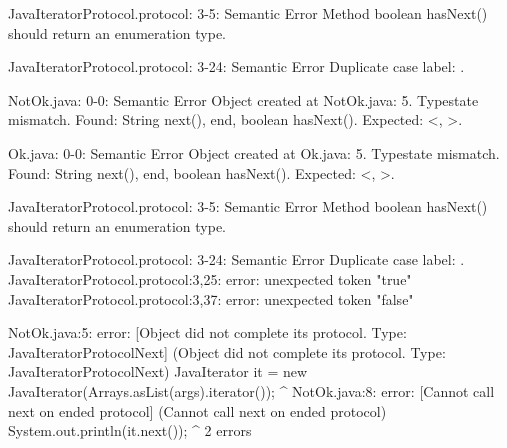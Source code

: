 \lstset{language=,caption=Original Mungo output}
\begin{code}

JavaIteratorProtocol.protocol: 3-5: Semantic Error
		Method boolean hasNext() should return an enumeration type.

JavaIteratorProtocol.protocol: 3-24: Semantic Error
		Duplicate case label: .

NotOk.java: 0-0: Semantic Error
		Object created at NotOk.java: 5. Typestate mismatch. Found: String next(), end, boolean hasNext(). Expected: <, >.

Ok.java: 0-0: Semantic Error
		Object created at Ok.java: 5. Typestate mismatch. Found: String next(), end, boolean hasNext(). Expected: <, >.

JavaIteratorProtocol.protocol: 3-5: Semantic Error
		Method boolean hasNext() should return an enumeration type.

JavaIteratorProtocol.protocol: 3-24: Semantic Error
		Duplicate case label: .
JavaIteratorProtocol.protocol:3,25: error: unexpected token "true"
JavaIteratorProtocol.protocol:3,37: error: unexpected token "false"
\end{code}

\lstset{language=,caption=New Mungo output}
\begin{code}
NotOk.java:5: error: [Object did not complete its protocol. Type: JavaIteratorProtocol{Next}] (Object did not complete its protocol. Type: JavaIteratorProtocol{Next})
    JavaIterator it = new JavaIterator(Arrays.asList(args).iterator());
                 ^
NotOk.java:8: error: [Cannot call next on ended protocol] (Cannot call next on ended protocol)
      System.out.println(it.next());
                                ^
2 errors
\end{code}

